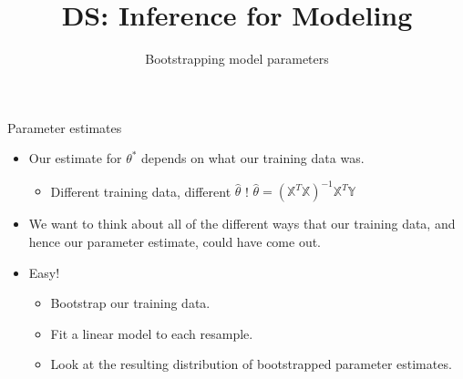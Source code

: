 \documentclass[aspectratio=169]{../latex_main/tntbeamer}  %
\title[Introduction]{DS: Inference for Modeling}
\subtitle{Bootstrapping model parameters}
\begin{document}
	
	\maketitle
	\begin{frame}{Parameter estimates}
	    \begin{itemize}
	        \item Our estimate for     $\theta^*$    depends on what our training data was.
	        \begin{itemize}
	            \item Different training data, different   $\hat{\theta}$   ! \hspace{2cm}  $\hat{\theta} = (\mathbb{X}^T\mathbb{X})^{-1}\mathbb{X}^T\mathbb{Y}$
	        \end{itemize}
	        \item We want to think about all of the different ways that our training data, and hence our parameter estimate, could have come out.
	        \item Easy!
	        \begin{itemize}
	            \item Bootstrap our training data.
	            \item Fit a linear model to each resample.
	            \item Look at the resulting distribution of bootstrapped parameter estimates.
	        \end{itemize}
	    \end{itemize}
	\end{frame}
	
\end{document}
